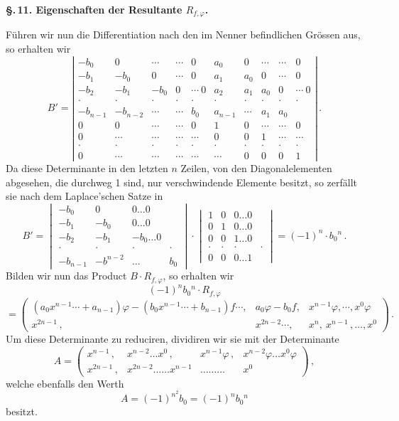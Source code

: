 \documentclass[11pt]{article}
\providecommand{\weberpage}[1]{}
\begin{document}
\weberpage{157}
\textbf{\S.\,11. Eigenschaften der Resultante $R_{f,\varphi}$.}

Führen wir nun die Differentiation nach den im Nenner befindlichen Grössen aus, so erhalten wir
\[
B' = \left|\begin{array}{ccccc|ccccc}
-b_0 & 0 & \cdots & \cdots & 0 & a_0 & 0 & \cdots & \cdots & 0\\
-b_1 & -b_0 & 0 & \cdots & 0 & a_1 & a_0 & 0 & \cdots & 0\\
-b_2 & -b_1 & -b_0 & 0 & \cdots\ 0 & a_2 & a_1 & a_0 & 0 & \cdots\ 0\\
\cdot & \cdot & \cdot & \cdot & \cdot & \cdot & \cdot & \cdot & \cdot & \cdot\\
-b_{n-1} & -b_{n-2} & \cdots & \cdots & b_0 & a_{n-1} & \cdots & a_1 & a_0 & \\
0 & 0 & \cdots & \cdots & 0 & 1 & 0 & \cdots & \cdots & 0\\
0 & \cdots & \cdots & \cdots & \cdots & 0 & 0 & 1 & \cdots & \cdots\\
\cdot & \cdot & \cdot & \cdot & \cdot & \cdot & \cdot & \cdot & \cdot & \cdot\\
0 & \cdots & \cdots & \cdots & \cdots & \cdots & 0 & 0 & 0 & 1
\end{array}\right|\,.
\]
Da diese Determinante in den letzten $n$ Zeilen, von den Diagonalelementen abgesehen, die durchweg 1 sind, nur verschwindende Elemente besitzt, so zerfällt sie nach dem Laplace'schen Satze in
\[
B' = \begin{vmatrix} -b_0 & 0 & 0\ldots 0\\ -b_1 & -b_0 & 0\ldots 0\\ -b_2 & -b_1 & -b_0\ldots 0\\ \cdot&\cdot&\cdot&\cdot\\ -b_{n-1}&-b^{n-2}&\ldots& b_0 \end{vmatrix}
\cdot
\begin{vmatrix} 1&0&0\ldots 0\\ 0&1&0\ldots 0\\ 0&0&1\ldots 0\\ \cdot&\cdot&\cdot&\cdot\\ 0&0&0\ldots 1 \end{vmatrix}
= (-1)^n\cdot b_0{}^n\,.
\]
Bilden wir nun das Product $B\cdot R_{f,\varphi}$, so erhalten wir
\[ (-1)^nb_0{}^n\cdot R_{f,\varphi} \]
\[ = \begin{pmatrix} (a_0x^{n-1}\cdots+a_{n-1})\varphi-(b_0x^{n-1}\cdots+b_{n-1})f\cdots, & a_0\varphi-b_0f, & x^{n-1}\varphi,\cdots,x^0\varphi\\ x^{2n-1}\,, & x^{2n-2}\cdots, & x^n,\ x^{n-1}\,,\ldots,x^0 \end{pmatrix}\,. \]
Um diese Determinante zu reduciren, dividiren wir sie mit der Determinante
\[ A = \begin{pmatrix} x^{n-1}\,, & x^{n-2}\ldots x^0\,, & x^{n-1}\varphi\,, & x^{n-2}\varphi\ldots x^0\varphi\\ x^{2n-1}\,, & x^{2n-2}\ldots\ldots x^{n-1} & \ldots\ldots\ldots & x^0 \end{pmatrix}\,, \]
welche ebenfalls den Werth
\[ A = (-1)^{n^2}b_0 = (-1)^nb_0{}^n \]
besitzt.
\end{document}
